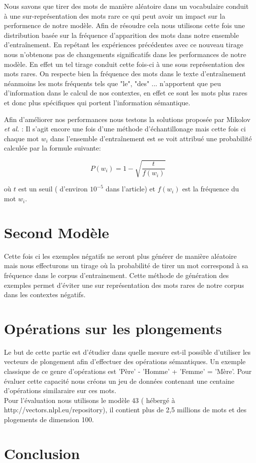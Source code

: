 \documentclass[12pt]{article}
\begin{document}
Nous savons que tirer des mots de manière aléatoire dans un vocabulaire conduit à une sur-représentation des mots rare ce qui peut avoir 
un impact sur la performence de notre modèle. Afin de résoudre cela nous utilisons cette fois une distribution basée sur la fréquence d'apparition des 
mots dans notre ensemble d'entraînement. 
En repétant les expériences précédentes avec ce nouveau tirage nous n'obtenons pas de changements significatifs dans les performances de notre modèle. En effet 
un tel tirage conduit cette fois-ci à une sous représentation des mots rares. On respecte bien la fréquence des mots dans le texte d'entraînement néanmoins les mots fréquents 
tels que "le", "des" ... n'apportent que peu d'information dans le calcul de nos contextes, en effet ce sont les mots plus rares et donc plus spécifiques qui portent l'information
sémantique. 

Afin d'améliorer nos performances nous testons la solutions proposée par  Mikolov \textit{et al.} \cite{mikolov2013distributed}:
Il s'agit encore une fois d'une méthode d'échantillonage mais cette fois ci chaque mot $w_i$ dans l'ensemble d'entraînement est 
se voit attribué  une probabilité calculée par la formule suivante:

\[
P(w_i) = 1 - \sqrt{\frac{t}{f(w_i)}}
\]

où $t$ est un seuil ( d'environ $10^{-5}$ dans l'article) et $f(w_i)$ est la fréquence du mot $w_i$.

\section{Second Modèle}

Cette fois ci les exemples négatifs ne seront plus générer de manière aléatoire mais nous effecturons 
un tirage où la probabilité de tirer un mot correspond à sa fréquence dans le corpus d'entrainement.
Cette méthode de génération des exemples permet d'éviter une sur représentation des mots rares de notre 
corpus dans les contextes négatifs.

\section{Opérations sur les plongements} 

Le but de cette partie est d'étudier dans quelle mesure est-il possible d'utiliser les vecteurs
de plongement afin d'effectuer des opérations sémantiques. Un exemple classique de ce genre d'opérations est
'Père' - 'Homme' + 'Femme' = 'Mère'. Pour évaluer cette capacité nous créons un jeu de données contenant une 
centaine d'opérations similaraire sur ces mots. \\
Pour l'évaluation nous utilisons le modèle 43 ( hébergé à http://vectors.nlpl.eu/repository), il contient 
plus de 2,5 millions de mots et des plogements de dimension 100.  


\section{Conclusion}


\end{document}
